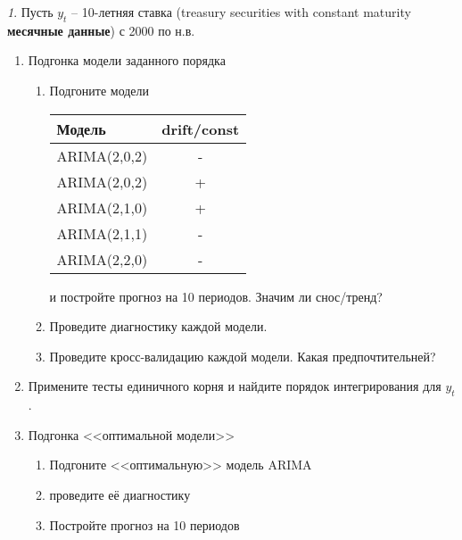 \documentclass[12pt]{article}
\theoremstyle{remark}
\newtheorem{exercise}{}[subsection]
\begin{document}
\begin{exercise}
Пусть \(y_t\) -- 10-летняя ставка (treasury securities  with constant maturity 
\textbf{месячные данные}) с 2000 по н.в.
\begin{enumerate}
	\item Подгонка модели заданного порядка
	\begin{enumerate}
		\item Подгоните модели
		\begin{center}
		\begin{tabular}{l|c}
			Модель & drift/const \\ \hline
			ARIMA(2,0,2) & - \\
			ARIMA(2,0,2) & + \\
			ARIMA(2,1,0) & + \\
			ARIMA(2,1,1) & - \\
			ARIMA(2,2,0) & - \\ \hline
		\end{tabular}
		\end{center} 
		и постройте прогноз на 10 периодов. Значим ли снос/тренд?
		\item Проведите диагностику каждой модели.
		\item Проведите кросс-валидацию каждой модели. Какая предпочтительней?
	\end{enumerate}
	\item Примените тесты единичного корня и найдите порядок интегрирования для \(y_t\). 
	\item Подгонка <<оптимальной модели>>
	\begin{enumerate}
		\item Подгоните <<оптимальную>> модель ARIMA
		\item проведите её диагностику
		\item Постройте прогноз на 10 периодов
	\end{enumerate}
\end{enumerate}
\end{exercise}
\end{document}
